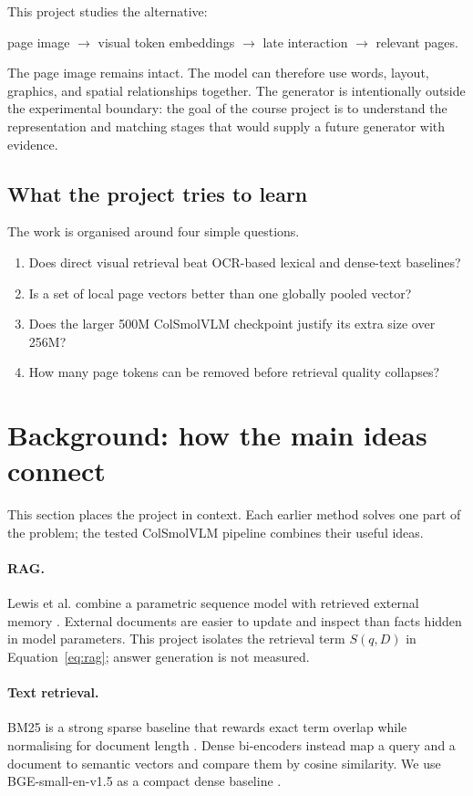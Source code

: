 \documentclass[11pt,a4paper]{article}
\begin{document}
This project studies the alternative:
\begin{center}
page image $\rightarrow$ visual token embeddings $\rightarrow$ late interaction $\rightarrow$ relevant pages.
\end{center}
The page image remains intact. The model can therefore use words, layout, graphics, and spatial relationships together. The generator is intentionally outside the experimental boundary: the goal of the course project is to understand the representation and matching stages that would supply a future generator with evidence.

\subsection{What the project tries to learn}

The work is organised around four simple questions.
\begin{enumerate}
  \item Does direct visual retrieval beat OCR-based lexical and dense-text baselines?
  \item Is a set of local page vectors better than one globally pooled vector?
  \item Does the larger 500M ColSmolVLM checkpoint justify its extra size over 256M?
  \item How many page tokens can be removed before retrieval quality collapses?
\end{enumerate}

\section{Background: how the main ideas connect}

This section places the project in context. Each earlier method solves one part of the problem; the tested ColSmolVLM pipeline combines their useful ideas.

\paragraph{RAG.} Lewis et al. combine a parametric sequence model with retrieved external memory \cite{lewis2020rag}. External documents are easier to update and inspect than facts hidden in model parameters. This project isolates the retrieval term $S(q,D)$ in Equation~\ref{eq:rag}; answer generation is not measured.

\paragraph{Text retrieval.} BM25 is a strong sparse baseline that rewards exact term overlap while normalising for document length \cite{robertson2009bm25}. Dense bi-encoders instead map a query and a document to semantic vectors and compare them by cosine similarity. We use BGE-small-en-v1.5 as a compact dense baseline \cite{xiao2023cpack}.
\end{document}
